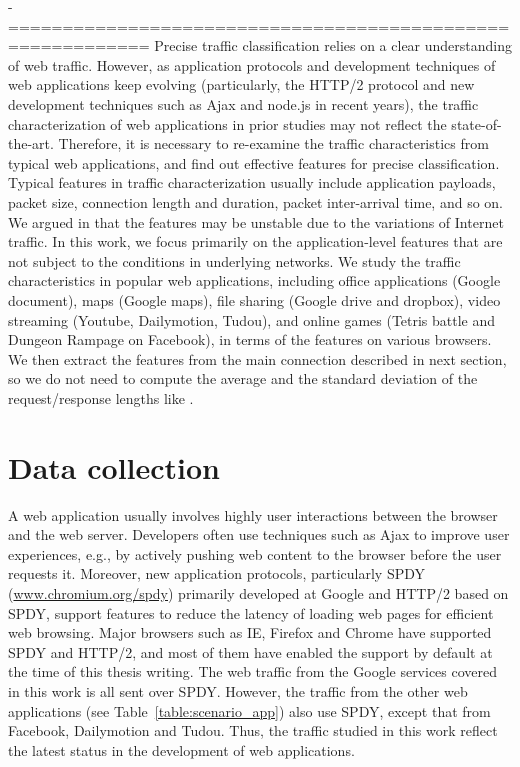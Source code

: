 -===========================================================
Precise traffic classification relies on a clear understanding of web traffic. However, as application protocols and development techniques of web applications keep evolving (particularly, the HTTP/2 protocol \cite{HTTP2} and new development techniques such as Ajax and node.js in recent years), the traffic characterization of web applications in prior studies may not reflect the state-of-the-art. Therefore, it is necessary to re-examine the traffic characteristics from typical web applications, and find out effective features for precise classification. Typical features in traffic characterization usually include application payloads, packet size, connection length and duration, packet inter-arrival time, and so on. We argued in \cite{TFT14} that the features may be unstable due to the variations of Internet traffic. In this work, we focus primarily on the application-level features that are not subject to the conditions in underlying networks. We study the traffic characteristics in popular web applications, including office applications (Google document), maps (Google maps), file sharing (Google drive and dropbox), video streaming (Youtube, Dailymotion, Tudou), and online games (Tetris battle and Dungeon Rampage on Facebook), in terms of the features on various browsers. We then extract the features from the main connection described in next section, so we do not need to compute the average and the standard deviation of the request/response lengths like \cite{TFT14}. 

\section{Data collection}
\label{sec:collect}

A web application usually involves highly user interactions between the browser and the web server. Developers often use techniques such as Ajax to improve user experiences, e.g., by actively pushing web content to the browser before the user requests it. Moreover, new application protocols, particularly SPDY (\url{www.chromium.org/spdy}) primarily developed at Google and HTTP/2 based on SPDY, support features to reduce the latency of loading web pages for efficient web browsing. Major browsers such as IE, Firefox and Chrome have supported SPDY and HTTP/2, and most of them have enabled the support by default at the time of this thesis writing. The web traffic from the Google services covered in this work is all sent over SPDY. However, the traffic  from the other web applications (see Table~\ref{table:scenario_app}) also use SPDY, except that from Facebook, Dailymotion and Tudou. Thus, the traffic studied in this work reflect the latest status in the development of web applications.  

